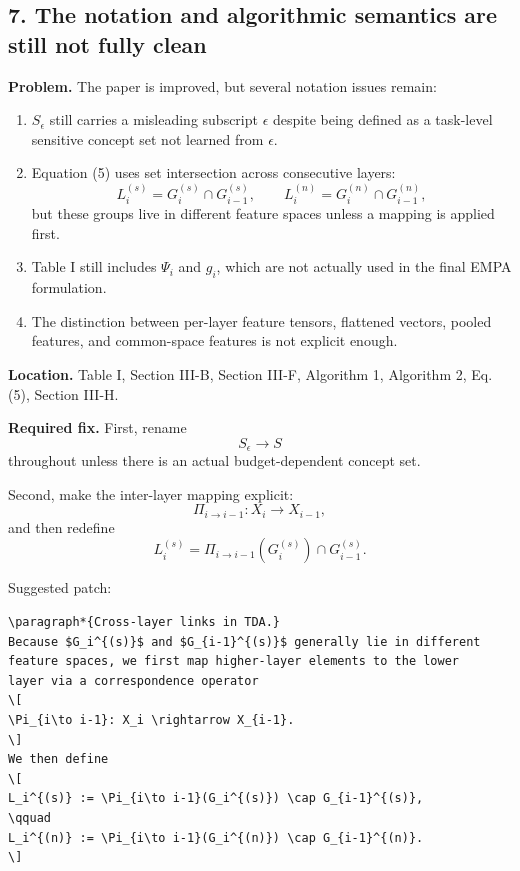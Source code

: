 \subsection*{7. The notation and algorithmic semantics are still not fully clean}

\textbf{Problem.}  
The paper is improved, but several notation issues remain:

\begin{enumerate}
\item $S_\epsilon$ still carries a misleading subscript $\epsilon$ despite being defined as a task-level sensitive concept set not learned from $\epsilon$.
\item Equation (5) uses set intersection across consecutive layers:
\[
L_i^{(s)} = G_i^{(s)} \cap G_{i-1}^{(s)},
\qquad
L_i^{(n)} = G_i^{(n)} \cap G_{i-1}^{(n)},
\]
but these groups live in different feature spaces unless a mapping is applied first.
\item Table I still includes $\Psi_i$ and $g_i$, which are not actually used in the final EMPA formulation.
\item The distinction between per-layer feature tensors, flattened vectors, pooled features, and common-space features is not explicit enough.
\end{enumerate}

\textbf{Location.}  
Table I, Section III-B, Section III-F, Algorithm 1, Algorithm 2, Eq. (5), Section III-H.

\textbf{Required fix.}  
First, rename
\[
S_\epsilon \to S
\]
throughout unless there is an actual budget-dependent concept set.

Second, make the inter-layer mapping explicit:
\[
\Pi_{i \to i-1} : X_i \to X_{i-1},
\]
and then redefine
\[
L_i^{(s)}
=
\Pi_{i \to i-1}(G_i^{(s)}) \cap G_{i-1}^{(s)}.
\]

Suggested patch:

\begin{verbatim}
\paragraph*{Cross-layer links in TDA.}
Because $G_i^{(s)}$ and $G_{i-1}^{(s)}$ generally lie in different
feature spaces, we first map higher-layer elements to the lower
layer via a correspondence operator
\[
\Pi_{i\to i-1}: X_i \rightarrow X_{i-1}.
\]
We then define
\[
L_i^{(s)} := \Pi_{i\to i-1}(G_i^{(s)}) \cap G_{i-1}^{(s)},
\qquad
L_i^{(n)} := \Pi_{i\to i-1}(G_i^{(n)}) \cap G_{i-1}^{(n)}.
\]
\end{verbatim}

